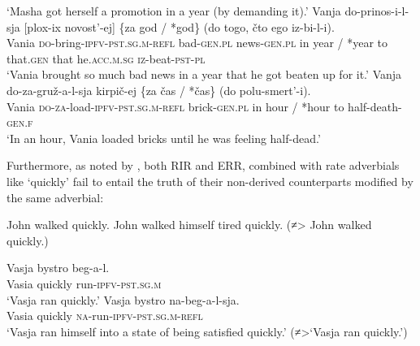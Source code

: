 \documentclass[output=paper,colorlinks,citecolor=brown,modfonts,nonflat]{langsci/langscibook}
\begin{document}
\ea%
    \label{ex:antonyuk:38}
    \glt    `Masha got herself  a promotion in a year (by demanding it).'
    \ex \label{ex:antonyuk:38b}
    \gll    Vanja do-prinos-i-l-sja [plox-ix novost’-ej] \{za god / *god\} (do togo, čto ego iz-bi-l-i).\\
            Vania \textsc{do-}bring\textsc{-ipfv-pst.sg.m-refl} \hspaceThis{[}bad\textsc{-gen.pl} news\textsc{-gen.pl} in year / *year to that\textsc{.gen} that he\textsc{.acc.m.sg} \textsc{iz-}beat\textsc{-pst-pl}\\
    \glt    `Vania brought so much bad news in a year that he got beaten up for it.'
    \ex \label{ex:antonyuk:38c}
    \gll    Vanja do-za-gruž-a-l-sja kirpič-ej \{za čas / *čas\} (do polu-smert’-i).\\
            Vania \textsc{do-za-}load\textsc{-ipfv-pst.sg.m-refl} brick\textsc{-gen.pl} in hour / *hour to half-death\textsc{-gen.f}\\
    \glt    `In an hour, Vania loaded bricks until he was feeling half-dead.'
    \z
\z

Furthermore, as noted by \citeauthor{Tatevosov2010}, both RIR and ERR, combined with rate adverbials like ‘quickly’ fail to entail the truth of their non-derived counterparts modified by the same adverbial:

\ea%
    \label{ex:antonyuk:39}
    \ea \label{ex:antonyuk:39a}
    John walked quickly.
    \ex \label{ex:antonyuk:39b}
    John walked himself tired quickly. (≠> John walked quickly.)
    \z
\z

\ea%
    \label{ex:antonyuk:40}
    \ea \label{ex:antonyuk:40a}
    \gll    Vasja bystro beg-a-l.\\
            Vasia quickly run\textsc{-ipfv-pst.sg.m}\\
    \glt    `Vasja ran quickly.'
    \ex \label{ex:antonyuk:40b}
    \gll    Vasja bystro na-beg-a-l-sja.\\
            Vasia quickly \textsc{na-}run\textsc{-ipfv-pst.sg.m-refl}\\
    \glt    `Vasja ran himself into a state of being satisfied quickly.' (≠>‘Vasja ran quickly.’)
    \z
\z
\end{document}
